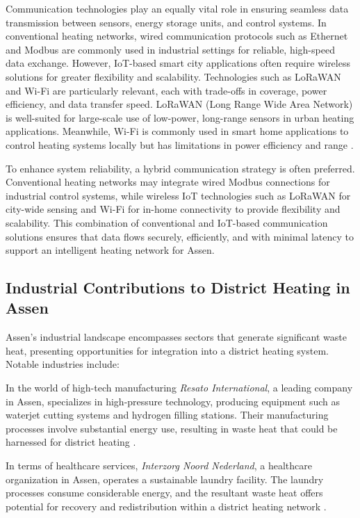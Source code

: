 \documentclass{article}
\begin{document}
Communication technologies play an equally vital role in ensuring seamless data transmission between sensors, energy storage units, and control systems. In conventional heating networks, wired communication protocols such as Ethernet and Modbus are commonly used in industrial settings for reliable, high-speed data exchange. However, IoT-based smart city applications often require wireless solutions for greater flexibility and scalability. Technologies such as LoRaWAN and Wi-Fi are particularly relevant, each with trade-offs in coverage, power efficiency, and data transfer speed. LoRaWAN (Long Range Wide Area Network) is well-suited for large-scale use of low-power, long-range sensors in urban heating applications. Meanwhile, Wi-Fi is commonly used in smart home applications to control heating systems locally but has limitations in power efficiency and range \cite{comm_tech_review}. 

To enhance system reliability, a hybrid communication strategy is often preferred. Conventional heating networks may integrate wired Modbus connections for industrial control systems, while wireless IoT technologies such as LoRaWAN for city-wide sensing and Wi-Fi for in-home connectivity to provide flexibility and scalability. This combination of conventional and IoT-based communication solutions ensures that data flows securely, efficiently, and with minimal latency to support an intelligent heating network for Assen.

\subsection{Industrial Contributions to District Heating in Assen}

Assen's industrial landscape encompasses sectors that generate significant waste heat, presenting opportunities for integration into a district heating system. Notable industries include:

In the world of high-tech manufacturing \textit{Resato International}, a leading company in Assen, specializes in high-pressure technology, producing equipment such as waterjet cutting systems and hydrogen filling stations. Their manufacturing processes involve substantial energy use, resulting in waste heat that could be harnessed for district heating \cite{resato_sustainability}.

In terms of healthcare services, \textit{Interzorg Noord Nederland}, a healthcare organization in Assen, operates a sustainable laundry facility. The laundry processes consume considerable energy, and the resultant waste heat offers potential for recovery and redistribution within a district heating network \cite{interzorg_laundry}.
\end{document}
